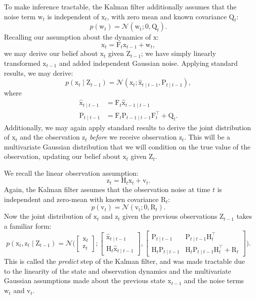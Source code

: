 \documentclass{article}
\newcommand{\given}{\mid}
\newcommand{\mc}[1]{\mathcal{#1}}
\newcommand{\trans}{^\top}
\newcommand{\mat}[1]{\bm{\mathrm{#1}}}
\renewcommand{\vec}[1]{\bm{\mathrm{#1}}}
\begin{document}
To make inference tractable, the Kalman filter additionally assumes
that the noise term $\vec{w}_t$ is independent of $\vec{x}_t$, with
zero mean and known covariance $\vec{Q}_t$:
\[
  p(\vec{w}_t) = \mc{N}(\vec{w_t}; \mat{0}, \mat{Q}_t).
\]
Recalling our assumption about the dynamics of $\vec{x}$:
\[
  \vec{x}_t = \mat{F}_t \vec{x}_{t - 1} + \vec{w}_t,
\]
we may derive our belief about $\vec{x}_t$ given $\mat{Z}_{t - 1}$; we
have simply linearly transformed $\vec{x}_{t - 1}$ and added
independent Gaussian noise.  Applying standard results, we may derive:
\[
  p(\vec{x}_t \given \mat{Z}_{t - 1})
  =
  \mc{N}(\vec{x}_t;
  \hat{\vec{x}}_{t \given t - 1},
  \mat{P}_{t \given t - 1}
  ),
\]
where
\begin{align*}
  \hat{\vec{x}}_{t \given t - 1}
  &=
  \mat{F}_t \hat{\vec{x}}_{t - 1 \given t - 1}
  \\
  \mat{P}_{t \given t - 1}
  &=
  \mat{F}_t
  \mat{P}_{t - 1 \given t - 1}
  \mat{F}_t\trans
  +
  \mat{Q}_t.
\end{align*}
Additionally, we may again apply standard results to derive the joint
distribution of $\vec{x}_t$ and the observation $\vec{z}_t$
\emph{before} we receive observation $\vec{z}_t$.  This will be a
multivariate Gaussian distribution that we will condition on the
true value of the observation, updating our belief about $\vec{x}_t$
given $\mat{Z}_t$.

We recall the linear observation assumption:
\[
  \vec{z}_t = \mat{H}_t \vec{x}_t + \vec{v}_t.
\]
Again, the Kalman filter assumes that the observation noise at time
$t$ is independent and zero-mean with known covariance $\mat{R}_t$:
\[
  p(\vec{v}_t) = \mc{N}(\vec{v_t}; \mat{0}, \mat{R}_t).
\]
Now the joint distribution of $\vec{x}_t$ and $\vec{z}_t$ given
the previous observations $\mat{Z}_{t - 1}$ takes a familiar form:
\[
  p(\vec{x}_t, \vec{z}_t \given \mat{Z}_{t - 1})
  =
  \mc{N}\biggl(
  \begin{bmatrix}
    \vec{x}_t
    \\
    \vec{z}_t
  \end{bmatrix}
  ;
  \begin{bmatrix}
    \hat{\vec{x}}_{t \given t - 1}
    \\
    \mat{H}_t
    \hat{\vec{x}}_{t \given t - 1}
  \end{bmatrix}
  ,
  \begin{bmatrix}
    \mat{P}_{t \given t - 1}
    &
    \mat{P}_{t \given t - 1}
    \mat{H}_t\trans
    \\
    \mat{H}_t \mat{P}_{t \given t - 1}
    &
    \mat{H}_t \mat{P}_{t \given t - 1} \mat{H}_t\trans + \mat{R}_t
  \end{bmatrix}\biggr).
\]
This is called the \emph{predict} step of the Kalman filter, and was
made tractable due to the linearity of the state and observation
dynamics and the multivariate Gaussian assumptions made about the
previous state $\mat{x}_{t - 1}$ and the noise terms $\vec{w}_t$ and
$\vec{v}_t$.
\end{document}
